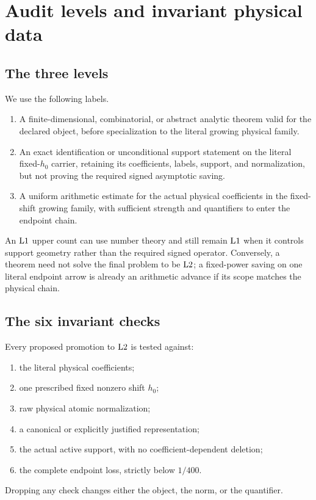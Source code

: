\section{Audit levels and invariant physical data}
\label{sec:audit-rules}

\subsection{The three levels}

\begin{definition}
\label{def:audit-levels}
We use the following labels.
\begin{enumerate}[label=\textup{\Lzero},leftmargin=4em]
 \item[\(\Lzero\)] A finite-dimensional, combinatorial, or abstract analytic
       theorem valid for the declared object, before specialization to the
       literal growing physical family.
 \item[\(\Lone\)] An exact identification or unconditional support statement
       on the literal fixed-\(h_0\) carrier, retaining its coefficients,
       labels, support, and normalization, but not proving the required
       signed asymptotic saving.
 \item[\(\Ltwo\)] A uniform arithmetic estimate for the actual physical
       coefficients in the fixed-shift growing family, with sufficient
       strength and quantifiers to enter the endpoint chain.
\end{enumerate}
\end{definition}

An \(\Lone\) upper count can use number theory and still remain \(\Lone\)
when it controls support geometry rather than the required signed operator.
Conversely, a theorem need not solve the final problem to be \(\Ltwo\); a
fixed-power saving on one literal endpoint arrow is already an arithmetic
advance if its scope matches the physical chain.

\subsection{The six invariant checks}

Every proposed promotion to \(\Ltwo\) is tested against:
\begin{enumerate}[label=\textup{(A\arabic*)},leftmargin=3.6em]
 \item the literal physical coefficients;
 \item one prescribed fixed nonzero shift \(h_0\);
 \item raw physical atomic normalization;
 \item a canonical or explicitly justified representation;
 \item the actual active support, with no coefficient-dependent deletion;
 \item the complete endpoint loss, strictly below \(1/400\).
\end{enumerate}
Dropping any check changes either the object, the norm, or the quantifier.

